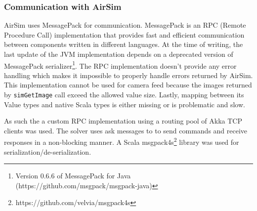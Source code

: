 \documentclass{article}
\let\cite\citep
\begin{document}
\subsubsection{Communication with AirSim}
AirSim uses MessagePack \cite{messagepack} for communication. MessagePack is an RPC (Remote Procedure Call) implementation that provides fast and efficient communication between components written in different languages. At the time of writing, the last update of the JVM implementation depends on a deprecated version of MessagePack serializer\footnote{Version 0.6.6 of MessagePack for Java (https://github.com/msgpack/msgpack-java)}. The RPC implementation doesn't provide any error handling which makes it impossible to properly handle errors returned by AirSim. This implementation cannot be used for camera feed because the images returned by \verb|simGetImage| call exceed the allowed value size. Lastly, mapping between its Value types and native Scala types is either missing or is problematic and slow.  

As such the a custom RPC implementation using a routing pool of Akka TCP clients was used. The solver uses ask messages to to send commands and receive responses in a non-blocking manner. A Scala msgpack4s\footnote{https://github.com/velvia/msgpack4s} library was used for serialization/de-serialization.




\end{document}
